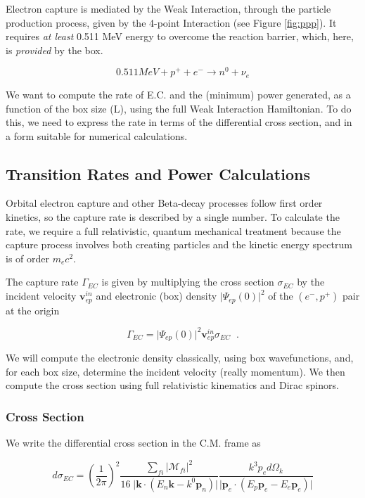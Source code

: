 \documentclass[%
 aip,
 jmp,%
 amsmath,amssymb,
 reprint,%
]{revtex4-1}
\begin{document}
Electron capture is mediated by the Weak Interaction, through the particle production process, given by the 4-point Interaction (see Figure \ref{fig:ppp}).   It requires \emph{at least} 0.511 MeV energy to overcome the reaction barrier, which, here, is \emph{provided} by the box. 

$$0.511{MeV}+p^{+}+e^{-}\rightarrow n^{0}+\nu_{e}$$  

We want to compute the rate of E.C. and the (minimum) power generated, as a function of the box size (L), using the full Weak Interaction Hamiltonian.  To do this, we need to express the rate in terms of the differential cross section, and in a form suitable for numerical calculations.  

\subsection{Transition Rates and Power Calculations}

Orbital electron capture and other Beta-decay processes follow first order kinetics, so the capture rate is described by a single number. 
To calculate the rate, we require a full relativistic, quantum mechanical treatment because the capture process involves both creating particles and the kinetic energy spectrum is of order $m_{e}c^{2}$.

 The capture rate $\Gamma_{EC}$  is given by multiplying the cross section $\sigma_{EC}$ by the incident velocity $\mathbf{v}^{in}_{ep}$ and electronic (box) density $\big\vert\Psi_{ep}(0)\big\vert^{2}$  of the $(e^{-},p^{+})$ pair at the origin

$$\Gamma_{EC}=\big\vert\Psi_{ep}(0)\big\vert^{2}\mathbf{v}^{in}_{ep}\sigma_{EC}\;\;.$$

We will compute the electronic density classically, using box wavefunctions, and, for each box size, determine the incident velocity (really momentum). We then compute the cross section using full relativistic kinematics and Dirac spinors.  

\subsubsection{Cross Section}

We write the differential cross section in the C.M. frame as

$$d\sigma_{EC}=\left(\dfrac{1}{2\pi}\right)^{2}\dfrac{\sum_{fi}\big\vert\mathcal{M}_{fi}\big\vert^{2}}{16\;\big\vert\mathbf{k}\cdot(E{_n}\mathbf{k}-k^{0}\mathbf{p}_{n})\big\vert}\dfrac{k^{3}p_{e}d\Omega_{k}}{\big\vert\mathbf{p}_{e}\cdot(E_{p}\mathbf{p}_{e}-E_{e}\mathbf{p}_{e})\big\vert}$$
\end{document}
